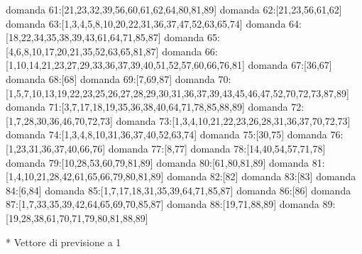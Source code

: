 domanda 61:[21,23,32,39,56,60,61,62,64,80,81,89]
domanda 62:[21,23,56,61,62]
domanda 63:[1,3,4,5,8,10,20,22,31,36,37,47,52,63,65,74]
domanda 64:[18,22,34,35,38,39,43,61,64,71,85,87]
domanda 65:[4,6,8,10,17,20,21,35,52,63,65,81,87]
domanda 66:[1,10,14,21,23,27,29,33,36,37,39,40,51,52,57,60,66,76,81]
domanda 67:[36,67]
domanda 68:[68]
domanda 69:[7,69,87]
domanda 70:[1,5,7,10,13,19,22,23,25,26,27,28,29,30,31,36,37,39,43,45,46,47,52,70,72,73,87,89]
domanda 71:[3,7,17,18,19,35,36,38,40,64,71,78,85,88,89]
domanda 72:[1,7,28,30,36,46,70,72,73]
domanda 73:[1,3,4,10,21,22,23,26,28,31,36,37,70,72,73]
domanda 74:[1,3,4,8,10,31,36,37,40,52,63,74]
domanda 75:[30,75]
domanda 76:[1,23,31,36,37,40,66,76]
domanda 77:[8,77]
domanda 78:[14,40,54,57,71,78]
domanda 79:[10,28,53,60,79,81,89]
domanda 80:[61,80,81,89]
domanda 81:[1,4,10,21,28,42,61,65,66,79,80,81,89]
domanda 82:[82]
domanda 83:[83]
domanda 84:[6,84]
domanda 85:[1,7,17,18,31,35,39,64,71,85,87]
domanda 86:[86]
domanda 87:[1,7,33,35,39,42,64,65,69,70,85,87]
domanda 88:[19,71,88,89]
domanda 89:[19,28,38,61,70,71,79,80,81,88,89]

* Vettore di previsione a 1

